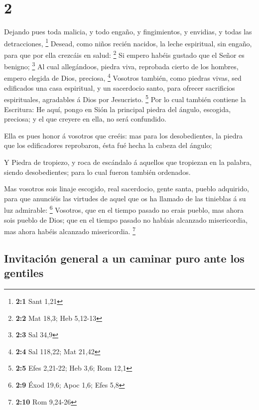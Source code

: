 \hypertarget{section-1}{%
\section{2}\label{section-1}}

 Dejando pues toda malicia, y todo engaño, y fingimientos, y
envidias, y todas las detracciones, \footnote{\textbf{2:1} Sant 1,21}
 Desead, como niños recién nacidos, la leche espiritual, sin
engaño, para que por ella crezcáis en salud: \footnote{\textbf{2:2} Mat
  18,3; Heb 5,12-13}  Si empero habéis gustado que el Señor
es benigno; \footnote{\textbf{2:3} Sal 34,9}  Al cual
allegándoos, piedra viva, reprobada cierto de los hombres, empero
elegida de Dios, preciosa, \footnote{\textbf{2:4} Sal 118,22; Mat 21,42}
 Vosotros también, como piedras vivas, sed edificados una
casa espiritual, y un sacerdocio santo, para ofrecer sacrificios
espirituales, agradables á Dios por Jesucristo. \footnote{\textbf{2:5}
  Efes 2,21-22; Heb 3,6; Rom 12,1}  Por lo cual también
contiene la Escritura: He aquí, pongo en Sión la principal piedra del
ángulo, escogida, preciosa; y el que creyere en ella, no será
confundido.

 Ella es pues honor á vosotros que creéis: mas para los
desobedientes, la piedra que los edificadores reprobaron, ésta fué hecha
la cabeza del ángulo;

 Y Piedra de tropiezo, y roca de escándalo á aquellos que
tropiezan en la palabra, siendo desobedientes; para lo cual fueron
también ordenados.

 Mas vosotros sois linaje escogido, real sacerdocio, gente
santa, pueblo adquirido, para que anunciéis las virtudes de aquel que os
ha llamado de las tinieblas á su luz admirable: \footnote{\textbf{2:9}
  Éxod 19,6; Apoc 1,6; Efes 5,8}  Vosotros, que en el
tiempo pasado no erais pueblo, mas ahora sois pueblo de Dios; que en el
tiempo pasado no habíais alcanzado misericordia, mas ahora habéis
alcanzado misericordia. \footnote{\textbf{2:10} Rom 9,24-26}

\hypertarget{invitaciuxf3n-general-a-un-caminar-puro-ante-los-gentiles}{%
\subsection{Invitación general a un caminar puro ante los
gentiles}\label{invitaciuxf3n-general-a-un-caminar-puro-ante-los-gentiles}}

